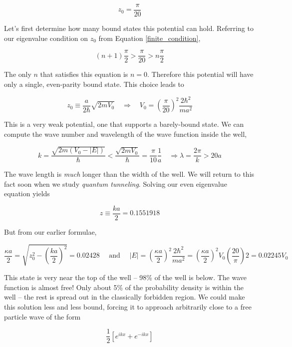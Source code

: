 \[
z_0 = \frac{\pi}{20}
\] \vspace{3px}

Let's first determine how many bound states this potential can hold. Referring
to our eigenvalue condition on $z_0$ from Equation \ref{finite_condition},  

\[
  (n+1)\frac{\pi}{2} > \frac{\pi}{20} > n\frac{\pi}{2} 
\] \vspace{3px}

The only $n$ that satisfies this equation is $n = 0$. Therefore this potential
will have only a single, even-parity bound state. This choice leads to

 \[
z_0 \equiv \frac{a}{2\hbar} \sqrt{2mV_0} \quad \Rightarrow \quad V_0 = \left(
\frac{\pi}{20} \right) ^2 \frac{2\hbar^2}{ma^2} 
\] \vspace{3px}

This is a very weak potential, one that supports a barely-bound state. We can
compute the wave number and wavelength of the wave function inside the well, 

\[
k = \frac{\sqrt{2m(V_0 - |E|)}}{\hbar} < \frac{\sqrt{2mV_0}}{\hbar}
= \frac{\pi}{10}\frac{1}{a} \quad \Rightarrow \lambda = \frac{2\pi}{k} > 20a
\] \vspace{3px}

The wave length is \textit{much} longer than the width of the well. We will
return to this fact soon when we study \textit{quantum tunneling}. Solving our
even eigenvalue equation yields 

\[
z \equiv \frac{ka}{2} = 0.1551918
\] \vspace{3px}

But from our earlier formulae, 

\[
\frac{\kappa a}{2} = \sqrt{z_0^2 - \left( \frac{ka}{2} \right) ^2 } = 0.02428
\quad \text{ and } \quad |E| = \left( \frac{\kappa a}{2} \right) ^2
\frac{2\hbar^2}{ma^2} = \left( \frac{\kappa a}{2} \right) ^2 V_0 \left(
\frac{20}{\pi} \right) 2 = 0.02245V_0   
\] \vspace{3px}

This state is very near the top of the well -- 98\% of the well is below. The
wave function is almost free! Only about 5\% of the probability density is
within the well -- the rest is spread out in the classically forbidden region.
We could make this solution less and less bound, forcing it to approach
arbitrarily close to a free particle wave of the form 

\[
  \frac{1}{2}\left[ e^{ikx} + e^{-ikx} \right]
\] \vspace{3px}

